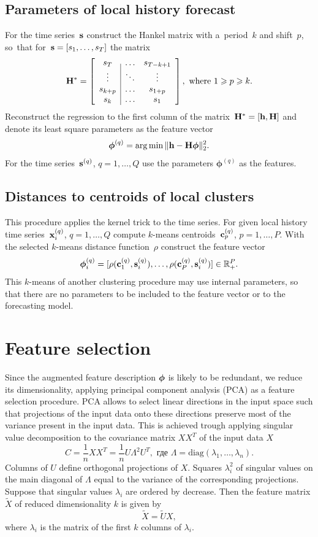 \documentclass[conference]{IEEEtran}
\begin{document}
\subsection{Parameters of local history forecast}
For the time series~${\mathbf{s}}$ construct the Hankel matrix with a~period~$k$ and shift~$p$, so~that for~${\mathbf{s}} = [s_1,\dots,s_T]$ the matrix
\[
\mathbf{H}^* =
\left[ \begin{array}{c|cc}
s_T  & \dots & s_{T-k+1} \\
\vdots & \ddots & \vdots \\
s_{k+p} & \dots & s_{1+p}\\
s_k & \dots & s_1 \\
\end{array}
\right],
\text{~where~} 1\geqslant p \geqslant k .
\]
Reconstruct the regression to the first column of the matrix~$\mathbf{H}^*=[{\mathbf{h}}, \mathbf{H}]$ and denote its least square parameters as the feature vector
\[
\boldsymbol{\phi}^{(q)} = \arg\min \| {\mathbf{h}}-\mathbf{H} \boldsymbol{\phi}\|_2^2.
\]
For the time series~${\mathbf{s}}^{(q)}$, $q=1,\dots, Q$ use the parameters $\boldsymbol{\phi}^{(q)}$ as the features.

\subsection{Distances to centroids of local clusters}
This procedure applies the kernel trick to the time series. For given local history time series~${\mathbf{x}}_i^{(q)}$, $q=1,\dots, Q$ compute $k$-means centroids~${\mathbf{c}}_p^{(q)}$, $p = 1, \dots, P$.  With the selected $k$-means distance function~$\rho$ construct the feature vector
\[
{\boldsymbol{\phi}}_i^{(q)} = [\rho({\mathbf{c}}_1^{(q)},{\mathbf{s}}_i^{(q)}),\dots,\rho({\mathbf{c}}^{(q)}_P,{\mathbf{s}}_i^{(q)})] \in \mathbb{R}_+^P.
\]
This $k$-means of another clustering procedure may use internal parameters, so that there are no parameters to be included to the feature vector or to the forecasting model.



\section{Feature selection}
Since the augmented feature description ${\boldsymbol{\phi}}$ is likely to be redundant, we reduce its dimensionality, applying principal component analysis (PCA) as a feature selection procedure.
PCA allows to select linear directions in the input space such that projections of the input data onto these directions preserve most of the variance present in the input data. This is achieved trough applying singular value decomposition to the covariance matrix $X X^T$ of the input data $X$
 \[C = \frac{1}{n}X X^T = \frac{1}{n} U\Lambda^2 U^T, \text{ где } \Lambda = \text{diag}(\lambda_1, \dots, \lambda_n).\]
 Columns of $U$ define orthogonal projections of $X$. Squares $\lambda^2_i$ of singular values on the main diagonal of $\Lambda$ equal to the variance of the corresponding projections. Suppose that singular values $\lambda_i$ are ordered by decrease. Then the feature matrix $\tilde{X}$ of reduced dimensionality $k$ is given by
\begin{equation}\label{eq:PCA}
\tilde{X} = \tilde{U} X,\end{equation}
where $\lambda_i$ is the matrix of the first $k$ columns of $\lambda_i$.
\end{document}
